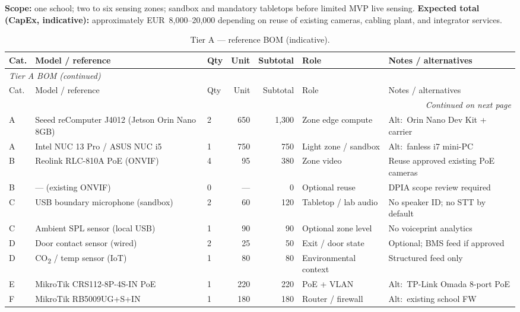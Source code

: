 \textbf{Scope:} one school; two to six sensing zones; sandbox and mandatory tabletops before limited
MVP live sensing.
\textbf{Expected total (CapEx, indicative):} approximately EUR~8{,}000--20{,}000 depending on reuse
of existing cameras, cabling plant, and integrator services.

\begin{longtable}{@{}p{0.7cm}p{2.4cm}p{2.6cm}r r p{2.2cm}p{2.5cm}@{}}
  \caption{Tier A --- reference BOM (indicative).}
  \label{tab:bom-tier-a} \\
  \toprule
  Cat. & Model / reference & Qty & Unit & Subtotal & Role & Notes / alternatives \\
  \midrule
  \endfirsthead
  \multicolumn{7}{l}{\textit{Tier A BOM (continued)}} \\
  \toprule
  Cat. & Model / reference & Qty & Unit & Subtotal & Role & Notes / alternatives \\
  \midrule
  \endhead
  \midrule
  \multicolumn{7}{r}{\textit{Continued on next page}} \\
  \endfoot
  \bottomrule
  \endlastfoot
  A & Seeed reComputer J4012 (Jetson Orin Nano 8GB) & 2 & 650 & 1{,}300 &
    Zone edge compute & Alt:\ Orin Nano Dev Kit + carrier \\
  A & Intel NUC 13 Pro / ASUS NUC i5 & 1 & 750 & 750 &
    Light zone / sandbox & Alt:\ fanless i7 mini-PC \\
  B & Reolink RLC-810A PoE (ONVIF) & 4 & 95 & 380 &
    Zone video & Reuse approved existing PoE cameras \\
  B & --- (existing ONVIF) & 0 & --- & 0 &
    Optional reuse & DPIA scope review required \\
  C & USB boundary microphone (sandbox) & 2 & 60 & 120 &
    Tabletop / lab audio & No speaker ID; no STT by default \\
  C & Ambient SPL sensor (local USB) & 1 & 90 & 90 &
    Optional zone level & No voiceprint analytics \\
  D & Door contact sensor (wired) & 2 & 25 & 50 &
    Exit / door state & Optional; BMS feed if approved \\
  D & CO\textsubscript{2} / temp sensor (IoT) & 1 & 80 & 80 &
    Environmental context & Structured feed only \\
  E & MikroTik CRS112-8P-4S-IN PoE & 1 & 220 & 220 &
    PoE + VLAN & Alt:\ TP-Link Omada 8-port PoE \\
  F & MikroTik RB5009UG+S+IN & 1 & 180 & 180 &
    Router / firewall & Alt:\ existing school FW \\

\end{longtable}
